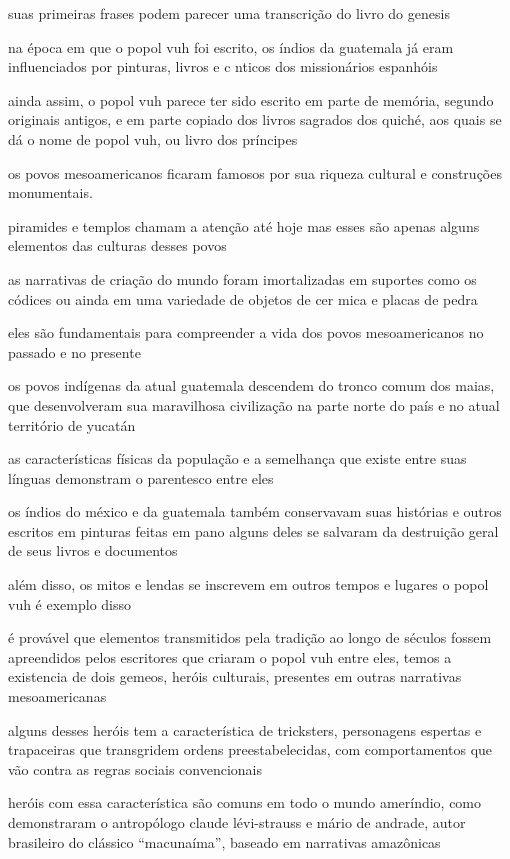 suas primeiras frases podem parecer uma transcrição do livro do genesis

na época em que o popol vuh foi escrito, os índios da guatemala já eram influenciados por pinturas, livros e c nticos dos missionários espanhóis

ainda assim, o popol vuh parece ter sido escrito em parte de memória, segundo originais antigos, e em parte copiado dos livros sagrados dos quiché, aos quais se dá o nome de popol vuh, ou livro dos príncipes

os povos mesoamericanos ficaram famosos por sua riqueza cultural e construções monumentais. 

piramides e templos chamam a atenção até hoje mas esses são apenas alguns elementos das culturas desses povos 

as narrativas de criação do mundo foram imortalizadas em suportes como os códices ou ainda em uma variedade de objetos de cer mica e placas de pedra

eles são fundamentais para compreender a vida dos povos mesoamericanos no passado e no presente

os povos indígenas da atual guatemala descendem do tronco comum dos maias, que desenvolveram sua maravilhosa civilização na parte norte do país e no atual território de yucatán

as características físicas da população e a semelhança que existe entre suas línguas demonstram o parentesco entre eles

os índios do méxico e da guatemala também conservavam suas histórias e outros escritos em pinturas feitas em pano alguns deles se salvaram da destruição geral de seus livros e documentos

além disso, os mitos e lendas se inscrevem em outros tempos e lugares o popol vuh é exemplo disso

é provável que elementos transmitidos pela tradição ao longo de séculos fossem apreendidos pelos escritores que criaram o popol vuh entre eles, temos a existencia de dois gemeos, heróis culturais, presentes em outras narrativas mesoamericanas

alguns desses heróis tem a característica de tricksters, personagens espertas e trapaceiras que transgridem ordens preestabelecidas, com comportamentos que vão contra as regras sociais convencionais

heróis com essa característica são comuns em todo o mundo ameríndio, como demonstraram o antropólogo claude lévi-strauss e mário de andrade, autor brasileiro do clássico “macunaíma”, baseado em narrativas amazônicas

